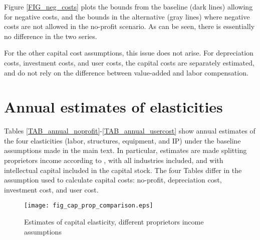 \documentclass[11pt]{article}
\begin{document}
Figure \ref{FIG_neg_costs} plots the bounds from the baseline (dark lines) allowing for negative costs, and the bounds in the alternative (gray lines) where negative costs are not allowed in the no-profit scenario. As can be seen, there is essentially no difference in the two series.

For the other capital cost assumptions, this issue does not arise. For depreciation costs, investment costs, and user costs, the capital costs are separately estimated, and do not rely on the difference between value-added and labor compensation.

\section{Annual estimates of elasticities}
Tables \ref{TAB_annual_noprofit}-\ref{TAB_annual_usercost} show annual estimates of the four elasticities (labor, structures, equipment, and IP) under the baseline assumptions made in the main text. In particular, estimates are made splitting proprietors income according to \cite{gommerupert2004}, with all industries included, and with intellectual capital included in the capital stock. The four Tables differ in the assumption used to calculate capital costs: no-profit, depreciation cost, investment cost, and user cost. 

\onehalfspacing
{\small


}


\begin{figure}[!htb]
\begin{center}
\caption{Estimates of capital elasticity, different proprietors income assumptions}
\label{FIG_cap_prop}
\texttt{[image: fig\_cap\_prop\_comparison.eps]}
\end{center}
\vspace{-.5cm}
\end{figure}
\end{document}
